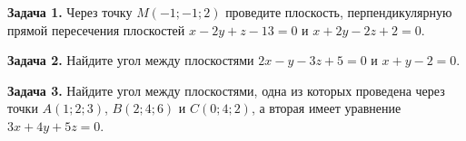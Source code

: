 \documentclass{article}
\begin{document}
\textbf{Задача 1.} Через точку $M(-1;-1;2)$ проведите плоскость, перпендикулярную прямой пересечения плоскостей $x-2y+z-13=0$ и $x+2y-2z+2=0$.

\textbf{Задача 2.} Найдите угол между плоскостями $2x-y-3z+5=0$ и $x+y-2=0$.

\textbf{Задача 3.} Найдите угол между плоскостями, одна из которых проведена через точки $A(1;2;3)$, $B(2;4;6)$ и $C(0;4;2)$, а вторая имеет уравнение $3x+4y+5z=0$.
\end{document}
